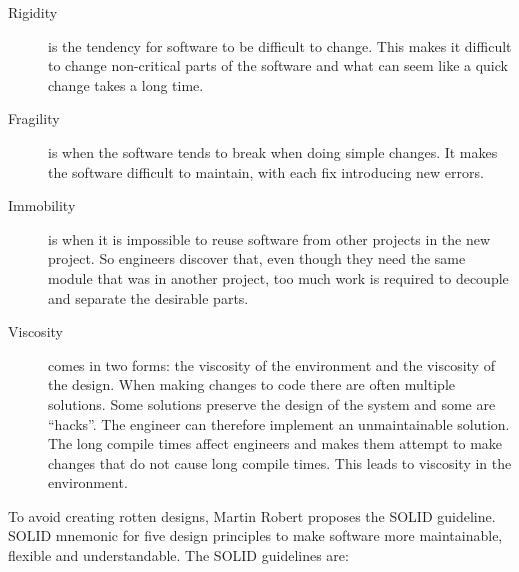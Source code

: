 \begin{description}

\item[ Rigidity ] is the tendency for software to be difficult to
change. This makes it difficult to change non-critical parts of the software and
what can seem like a quick change takes a long time.

\item[ Fragility ] is when the software tends to break when doing
simple changes. It makes the software difficult to maintain, with each fix
introducing new errors.

\item[ Immobility ] is when it is impossible to reuse software from
other projects in the new project. So engineers discover that, even though they
need the same module that was in another project, too much work is required to
decouple and separate the desirable parts.

\item[ Viscosity ] comes in two forms: the viscosity of the environment and the
viscosity of the design. When making changes to code there are often multiple
solutions. Some solutions preserve the design of the system and some are
``hacks''. The engineer can therefore implement an unmaintainable solution. The
long compile times affect engineers and makes them attempt to make changes that
do not cause long compile times.  This leads to viscosity in the environment.

\end{description}

To avoid creating rotten designs, Martin Robert proposes the SOLID guideline.
SOLID mnemonic for five design principles to make software more maintainable,
flexible and understandable. The SOLID guidelines are:

